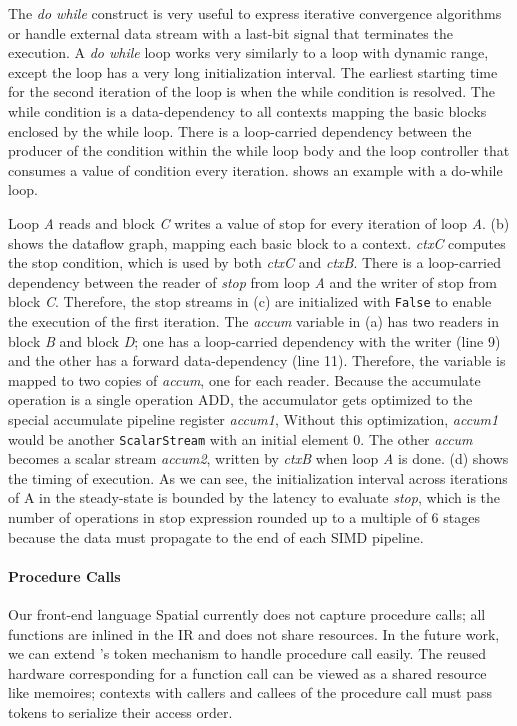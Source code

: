 The \emph{do while} construct is very useful to express iterative convergence algorithms or handle external
data stream with a last-bit signal that terminates the execution.
A \emph{do while} loop works very similarly to a loop with dynamic range, except the loop has a very long
initialization interval. The earliest starting time for the second iteration of the loop is when the while condition is resolved.
The while condition is a data-dependency to all contexts mapping the basic blocks enclosed by the while loop.
There is a loop-carried dependency between the producer of the condition within the while loop body
and the loop controller that consumes a value of condition every iteration.
 shows an example with a do-while loop.

Loop \emph{A} reads and block \emph{C} writes a value of stop for every iteration of loop
\emph{A}.
 (b) shows the dataflow graph, mapping each basic block to a context.
\emph{ctxC} computes the stop condition, which is used by both \emph{ctxC} and \emph{ctxB}.
There is a loop-carried dependency between the reader of \emph{stop} from loop \emph{A} and the
writer of stop from block \emph{C}. Therefore, the stop streams in (c) are initialized with 
\texttt{False} to enable the execution of the first iteration.
The \emph{accum} variable in (a) has two readers in block \emph{B} and block \emph{D}; one has a
loop-carried dependency with the writer (line 9) and the other has a forward data-dependency (line
11). 
Therefore, the variable is mapped to two copies of \emph{accum}, one for each reader. 
Because the accumulate operation is a single operation ADD, the accumulator gets optimized to the special
accumulate pipeline register \emph{accum1}, 
Without this optimization, \emph{accum1} would be another \texttt{ScalarStream} with an initial
element 0.
The other \emph{accum} becomes a scalar stream \emph{accum2}, written by \emph{ctxB} when loop \emph{A}
is done.
(d) shows the timing of execution. As we can see, the initialization interval across iterations of
A in the steady-state is bounded by the latency to evaluate \emph{stop}, which is the number of
operations in stop expression rounded up to a multiple of 6 stages because the data must
propagate to the end of each SIMD pipeline.

\paragraph{Procedure Calls}
Our front-end language Spatial currently does not capture procedure calls; 
all functions are inlined in the IR and does not share resources. 
In the future work, we can extend \name's token mechanism to handle procedure call easily. 
The reused hardware corresponding for a function call 
can be viewed as a shared resource like memoires; contexts with callers and callees of the procedure call
must pass tokens to serialize their access order.

